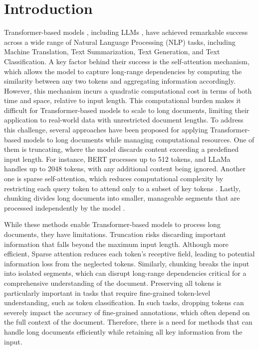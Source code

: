 \documentclass[11pt]{article}
\begin{document}
\section{Introduction}
Transformer-based models \citep{vaswani2017attention}, including LLMs \citep{radford2018improving, radford2019language, brown2020language, ouyang2022training, touvron2023llama, touvron2023llama2, chowdhery2023palm, anil2023palm, dubey2024llama}, have achieved remarkable success across a wide range of Natural Language Processing (NLP) tasks, including Machine Translation, Text Summarization, Text Generation, and Text Classification. A key factor behind their success is the self-attention mechanism, which allows the model to capture long-range dependencies by computing the similarity between any two tokens and aggregating information accordingly. However, this mechanism incurs a quadratic computational cost in terms of both time and space, relative to input length. This computational burden makes it difficult for Transformer-based models to scale to long documents, limiting their application to real-world data with unrestricted document lengths.
To address this challenge, several approaches have been proposed for applying Transformer-based models to long documents while managing computational resources. One of them is truncating, where the model discards content exceeding a predefined input length. For instance, BERT \citep{kenton2019bert} processes up to 512 tokens, and LLaMa \citep{touvron2023llama} handles up to 2048 tokens, with any additional content being ignored. Another one is sparse self-attention, which reduces computational complexity by restricting each query token to attend only to a subset of key tokens \citep{child2019generating,beltagy2020longformer,zaheer2020big,wei2021finetuned,li2023towards}. Lastly, chunking divides long documents into smaller, manageable segments that are processed independently by the model \citep{zhao2021ror,zhang2022summn}. 

While these methods enable Transformer-based models to process long documents, they have limitations. Truncation risks discarding important information that falls beyond the maximum input length. Although more efficient, Sparse attention reduces each token's receptive field, leading to potential information loss from the neglected tokens. Similarly, chunking breaks the input into isolated segments, which can disrupt long-range dependencies critical for a comprehensive understanding of the document.
Preserving all tokens is particularly important in tasks that require fine-grained token-level understanding, such as token classification. In such tasks, dropping tokens can severely impact the accuracy of fine-grained annotations, which often depend on the full context of the document. Therefore, there is a need for methods that can handle long documents efficiently while retaining all key information from the input.
\end{document}
